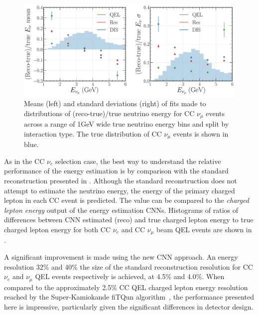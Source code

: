 \begin{figure} %
    \includegraphics[width=\textwidth]{diagrams/7-results/final_energy_numu.pdf}
    \caption[Means and standard deviations of fits to $\nu_{\mu}$ energy distributions]
    {Means (left) and standard deviations (right) of fits made to distributions of
        (reco-true)/true neutrino energy for CC $\nu_{\mu}$ events across a range of \unit{1}{GeV}
        wide true neutrino energy bins and split by interaction type. The true distribution of CC
        $\nu_{\mu}$ events is shown in blue.}
    \label{fig:final_energy_numu}
\end{figure}

As in the CC $\nu_{e}$ selection case, the best way to understand the relative performance of the
energy estimation is by comparison with the standard \chips reconstruction presented in
. Although the standard reconstruction does not attempt to estimate
the neutrino energy, the energy of the primary charged lepton in each CC event is predicted. The
value can be compared to the \emph{charged lepton energy} output of the energy estimation CNNs.
Histograms of ratios of differences between CNN estimated (reco) and true charged lepton energy to
true charged lepton energy for both CC $\nu_{e}$ and CC $\nu_{\mu}$ beam QEL events are shown in
.

A significant improvement is made using the new CNN approach. An energy resolution 32\% and 40\%
the size of the standard reconstruction resolution for CC $\nu_{e}$ and $\nu_{\mu}$ QEL events
respectively is achieved, at 4.5\% and 4.0\%. When compared to the approximately 2.5\% CC QEL
charged lepton energy resolution reached by the Super-Kamiokande fiTQun
algorithm~\cite{jiang2019}, the performance presented here is impressive, particularly given the
significant differences in detector design.

